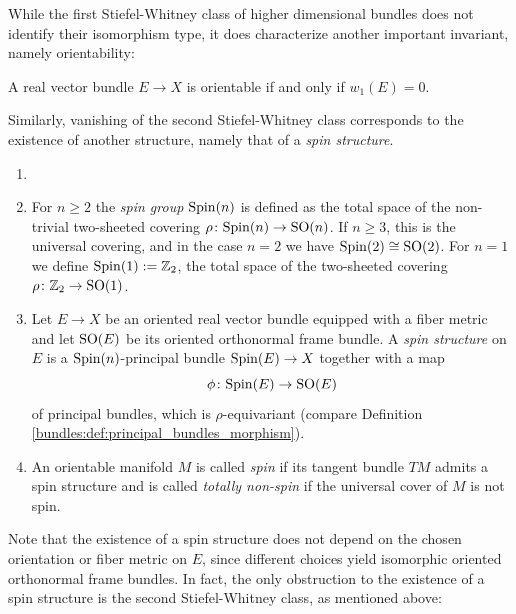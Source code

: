 While the first Stiefel-Whitney class of higher dimensional bundles does not identify their isomorphism type, it does characterize another important invariant, namely orientability:

\begin{proposition}
    \label{bundles:prop:orientable_iff_w1_vanishes}
    A real vector bundle $E \to X$ is orientable if and only if $w_1(E) = 0$.
\end{proposition}

Similarly, vanishing of the second Stiefel-Whitney class corresponds to the existence of another structure, namely that of a \textit{spin structure}. 

\needspace{5cm}
\begin{definition}
    \begin{enumerate}[label=(\roman*)]
        \item[]
        \item \vspace{-.5em}For $n \geq 2$ the \textit{spin group} $\mathrm{Spin}(n)$ is defined as the total space of the non-trivial two-sheeted covering $\rho \colon \mathrm{Spin}(n) \to \mathrm{SO}(n)$. If $n \geq 3$, this is the universal covering, and in the case $n=2$ we have $\mathrm{Spin}(2) \cong \mathrm{SO}(2)$. For $n=1$ we define $\mathrm{Spin}(1) := \mathbb{Z}_2$, the total space of the two-sheeted covering $\rho \colon \mathbb{Z}_2 \to \mathrm{SO}(1)$.
        \item Let $E \to X$ be an oriented real vector bundle equipped with a fiber metric and let $\mathrm{SO}(E)$ be its oriented orthonormal frame bundle. A \textit{spin structure} on $E$ is a $\mathrm{Spin}(n)$-principal bundle $\mathrm{Spin}(E) \to X$ together with a map 
        \[
        \phi \colon \mathrm{Spin}(E) \to \mathrm{SO}(E)
        \]
        of principal bundles, which is $\rho$-equivariant (compare Definition \ref{bundles:def:principal_bundles_morphism}).
        \item An orientable manifold $M$ is called \textit{spin} if its tangent bundle $TM$ admits a spin structure and is called \textit{totally non-spin} if the universal cover of $M$ is not spin.
    \end{enumerate}
\end{definition}

Note that the existence of a spin structure does not depend on the chosen orientation or fiber metric on $E$, since different choices yield isomorphic oriented orthonormal frame bundles. In fact, the only obstruction to the existence of a spin structure is the second Stiefel-Whitney class, as mentioned above:

